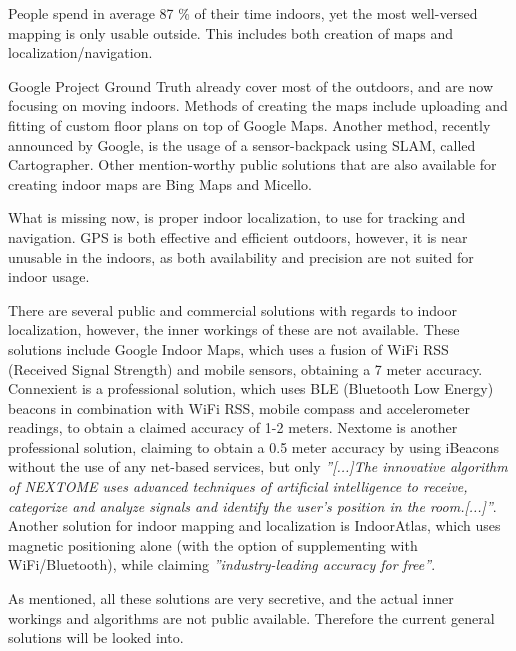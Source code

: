 
People spend in average 87 \% of their time indoors\cite{time_spend_indoor}, yet the most well-versed mapping is only usable outside.
This includes both creation of maps and localization/navigation.

Google Project Ground Truth\cite{googleio_ground_truth} already cover most of the outdoors, and are now focusing on moving indoors\cite{googleio_indoor_maps}\cite{indoor_maps_google_slides}.
Methods of creating the maps include uploading and fitting of custom floor plans on top of Google Maps.
Another method, recently announced by Google, is the usage of a sensor-backpack using SLAM, called Cartographer\cite{cartographer}.
Other mention-worthy public solutions that are also available for creating indoor maps are Bing Maps\cite{bingmaps} and Micello\cite{micello}.

What is missing now, is proper indoor localization, to use for tracking and navigation.
GPS\cite{gps} is both effective and efficient outdoors, however, it is near unusable in the indoors, as both availability and precision are not suited for indoor usage.

There are several public and commercial solutions with regards to indoor localization, however, the inner workings of these are not available.
These solutions include Google Indoor Maps, which uses a fusion of WiFi RSS (Received Signal Strength) and mobile sensors, obtaining a 7 meter accuracy\cite{googleio_indoor_maps}.
Connexient is a professional solution, which uses BLE (Bluetooth Low Energy) beacons in combination with WiFi RSS, mobile compass and accelerometer readings, to obtain a claimed accuracy of 1-2 meters\cite{connexient_indoor_pos}.
Nextome is another professional solution, claiming to obtain a 0.5 meter accuracy by using iBeacons\cite{ibeacon} without the use of any net-based services, but only \textit{''[...]The innovative algorithm of NEXTOME uses advanced techniques of artificial intelligence to receive, categorize and analyze signals and identify the user’s position in the room.[...]''}\cite{nextome_indoor_pos}.
Another solution for indoor  mapping and localization is IndoorAtlas, which uses magnetic positioning alone (with the option of supplementing with WiFi/Bluetooth), while claiming \textit{''industry-leading accuracy for free''}\cite{indooratlas_features}.

As mentioned, all these solutions are very secretive, and the actual inner workings and algorithms are not public available.
Therefore the current general solutions will be looked into.